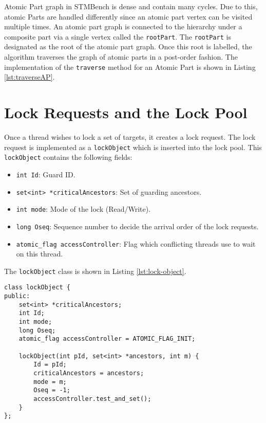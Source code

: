Atomic Part graph in STMBench is dense and contain many cycles. Due to this, atomic Parts are handled differently since an atomic part vertex can be visited multiple times. An atomic part graph is connected to the hierarchy under a composite part via a single vertex called the \texttt{rootPart}. The \texttt{rootPart} is designated as the root of the atomic part graph. Once this root is labelled, the algorithm traverses the graph of atomic parts in a post-order fashion. The implementation of the \texttt{traverse} method for an Atomic Part is shown in Listing \ref{lst:traverseAP}.



\section{Lock Requests and the Lock Pool}

Once a thread wishes to lock a set of targets, it creates a lock request. The lock request is implemented as a \texttt{lockObject} which is inserted into the lock pool. This \texttt{lockObject} contains the following fields:

\begin{itemize}
    \item \texttt{int Id}: Guard ID.
    \item \texttt{set<int> *criticalAncestors}: Set of guarding ancestors.
    \item \texttt{int mode}: Mode of the lock (Read/Write).
    \item \texttt{long Oseq}: Sequence number to decide the arrival order of the lock requests.
    \item \texttt{atomic\_flag accessController}: Flag which conflicting threads use to wait on this thread.
\end{itemize}

The \texttt{lockObject} class is shown in Listing \ref{lst:lock-object}. 

\begin{lstlisting}[caption={Lock Object class}, label={lst:lock-object}]
class lockObject {
public:
    set<int> *criticalAncestors;
    int Id;
    int mode;
    long Oseq;
    atomic_flag accessController = ATOMIC_FLAG_INIT;

    lockObject(int pId, set<int> *ancestors, int m) {
        Id = pId;
        criticalAncestors = ancestors;
        mode = m;
        Oseq = -1;
        accessController.test_and_set();
    }
};
\end{lstlisting}

